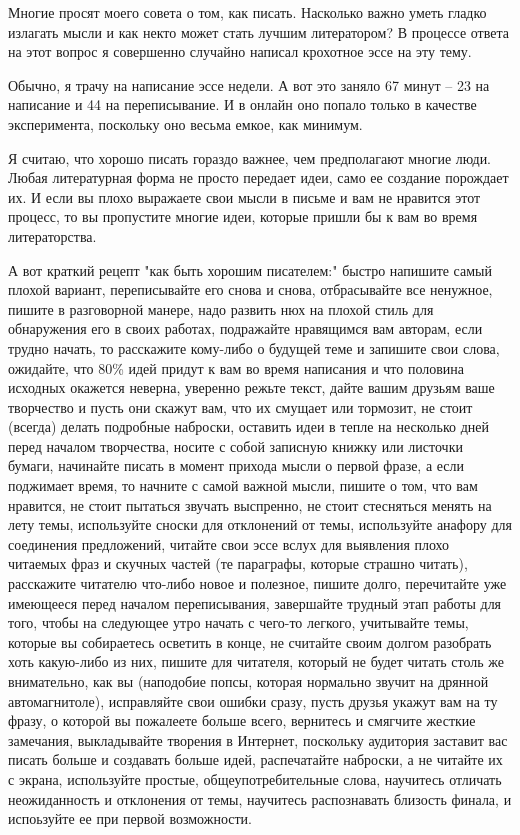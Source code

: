 \documentclass[ebook,12pt,oneside,openany]{memoir}
\begin{document}
\maketitle

Многие просят моего совета о том, как писать. Насколько важно уметь
гладко излагать мысли и как некто может стать лучшим литератором? В
процессе ответа на этот вопрос я совершенно случайно написал крохотное
эссе на эту тему.

Обычно, я трачу на написание эссе недели. А вот это заняло 67 минут --
23 на написание и 44 на переписывание. И в онлайн оно попало только в
качестве эксперимента, поскольку оно весьма емкое, как минимум.

Я считаю, что хорошо писать гораздо важнее, чем предполагают многие
люди. Любая литературная форма не просто передает идеи, само ее
создание порождает их. И если вы плохо выражаете свои мысли в письме и
вам не нравится этот процесс, то вы пропустите многие идеи, которые
пришли бы к вам во время литераторства.

А вот краткий рецепт "как быть хорошим писателем:" быстро напишите
самый плохой вариант, переписывайте его снова и снова, отбрасывайте
все ненужное, пишите в разговорной манере, надо развить нюх на плохой
стиль для обнаружения его в своих работах, подражайте нравящимся вам
авторам, если трудно начать, то расскажите кому-либо о будущей теме и
запишите свои слова, ожидайте, что 80\% идей придут к вам во время
написания и что половина исходных окажется неверна, уверенно режьте
текст, дайте вашим друзьям ваше творчество и пусть они скажут вам, что
их смущает или тормозит, не стоит (всегда) делать подробные наброски,
оставить идеи в тепле на несколько дней перед началом творчества,
носите с собой записную книжку или листочки бумаги, начинайте писать в
момент прихода мысли о первой фразе, а если поджимает время, то
начните с самой важной мысли, пишите о том, что вам нравится, не стоит
пытаться звучать выспренно, не стоит стесняться менять на лету темы,
используйте сноски для отклонений от темы, используйте анафору для
соединения предложений, читайте свои эссе вслух для выявления плохо
читаемых фраз и скучных частей (те параграфы, которые страшно читать),
расскажите читателю что-либо новое и полезное, пишите долго,
перечитайте уже имеющееся перед началом переписывания, завершайте
трудный этап работы для того, чтобы на следующее утро начать с чего-то
легкого, учитывайте темы, которые вы собираетесь осветить в конце, не
считайте своим долгом разобрать хоть какую-либо из них, пишите для
читателя, который не будет читать столь же внимательно, как вы
(наподобие попсы, которая нормально звучит на дрянной автомагнитоле),
исправляйте свои ошибки сразу, пусть друзья укажут вам на ту фразу, о
которой вы пожалеете больше всего, вернитесь и смягчите жесткие
замечания, выкладывайте творения в Интернет, поскольку аудитория
заставит вас писать больше и создавать больше идей, распечатайте
наброски, а не читайте их с экрана, используйте простые,
общеупотребительные слова, научитесь отличать неожиданность и
отклонения от темы, научитесь распознавать близость финала, и
испоьзуйте ее при первой возможности.
\end{document}
